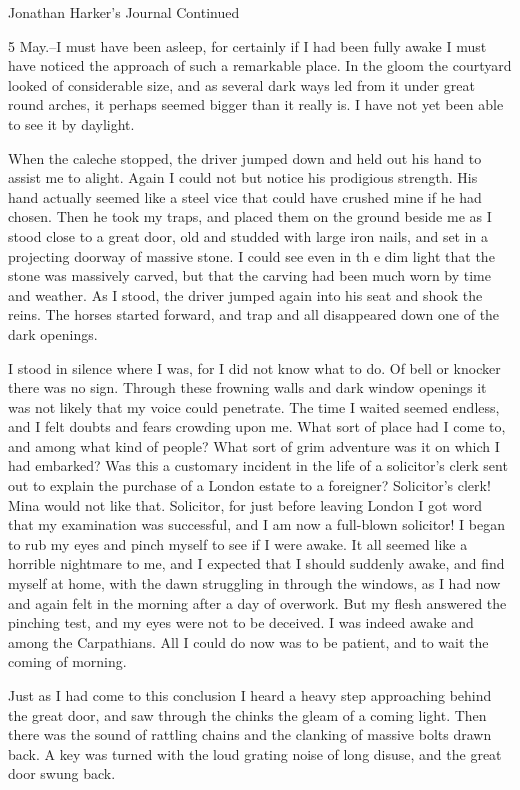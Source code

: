 Jonathan Harker's Journal Continued 

5 May.--I must have been asleep, for certainly if I had been fully awake I must have noticed the approach of such a remarkable place. In the gloom the courtyard looked of considerable size, and as several dark ways led from it under great round arches, it perhaps seemed bigger than it really is. I have not yet been able to see it by daylight. 

When the caleche stopped, the driver jumped down and held out his hand to assist me to alight. Again I could not but notice his prodigious strength. His hand actually seemed like a steel vice that could have crushed mine if he had chosen. Then he took my traps, and placed them on the ground beside me as I stood close to a great door, old and studded with large iron nails, and set in a projecting doorway of massive stone. I could see even in th e dim light that the stone was massively carved, but that the carving had been much worn by time and weather. As I stood, the driver jumped again into his seat and shook the reins. The horses started forward, and trap and all disappeared down one of the dark openings. 

I stood in silence where I was, for I did not know what to do. Of bell or knocker there was no sign. Through these frowning walls and dark window openings it was not likely that my voice could penetrate. The time I waited seemed endless, and I felt doubts and fears crowding upon me. What sort of place had I come to, and among what kind of people? What sort of grim adventure was it on which I had embarked? Was this a customary incident in the life of a solicitor's clerk sent out to explain the purchase of a London estate to a foreigner? Solicitor's clerk! Mina would not like that. Solicitor, for just before leaving London I got word that my examination was successful, and I am now a full-blown solicitor! I began to rub my eyes and pinch myself to see if I were awake. It all seemed like a horrible nightmare to me, and I expected that I should suddenly awake, and find myself at home, with the dawn struggling in through the windows, as I had now and again felt in the morning after a day of overwork. But my flesh answered the pinching test, and my eyes were not to be deceived. I was indeed awake and among the Carpathians. All I could do now was to be patient, and to wait the coming of morning. 

Just as I had come to this conclusion I heard a heavy step approaching behind the great door, and saw through the chinks the gleam of a coming light. Then there was the sound of rattling chains and the clanking of massive bolts drawn back. A key was turned with the loud grating noise of long disuse, and the great door swung back. 

